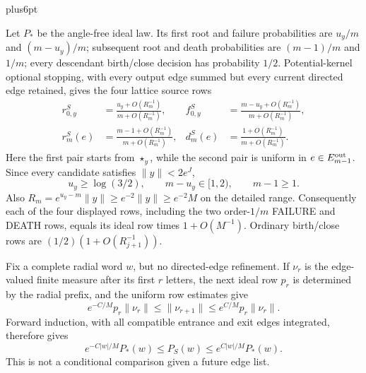 \documentclass[12pt,reqno]{amsart}
\makeatletter
\theoremstyle{plain}
\theoremstyle{definition}
\theoremstyle{remark}
\renewenvironment{proof}[1][\proofname]{%
  \par
  \pushQED{\qed}%
  \normalfont
  \topsep6pt plus6pt\relax
  \trivlist
  \item[\hskip\labelsep\slshape #1\@addpunct{.}]%
  \ignorespaces
}{%
  \popQED
  \endtrivlist
  \@endpefalse
}
\DeclareRobustCommand{\qed}{%
  \leavevmode\unskip\penalty9999\hbox{}\nobreak
  \ifmmode
    \makebox[0pt][l]{\qquad\hbox{\qedsymbol}}%
  \else
    \qquad\hbox{\qedsymbol}%
  \fi
}
\renewcommand{\qedsymbol}{\rule[.47pt]{4pt}{6pt}}
\numberwithin{equation}{section}
\makeatother
\begin{document}
\begin{proof}[Proof of Lemma~\ref{lem:buffered-transfer}]
Let $P_*$ be the angle-free ideal law.  Its first root and failure
probabilities are $u_y/m$ and $(m-u_y)/m$; subsequent root and death
probabilities are $(m-1)/m$ and $1/m$; every descendant
birth/close decision has probability $1/2$.  Potential-kernel optional
stopping, with every output edge summed but every current directed edge
retained, gives the four lattice source rows
\begin{equation}
\begin{aligned}
 r_{0,y}^S
   &=\frac{u_y+O(R_m^{-1})}{m+O(R_m^{-1})},
 & f_{0,y}^S
   &=\frac{m-u_y+O(R_m^{-1})}{m+O(R_m^{-1})},\\
 r_m^S(e)
   &=\frac{m-1+O(R_m^{-1})}{m+O(R_m^{-1})},
 & d_m^S(e)
   &=\frac{1+O(R_m^{-1})}{m+O(R_m^{-1})}.
\end{aligned}\label{eq:ct-transfer-45f-src}
\end{equation}
Here the first pair starts from $\star_y$, while the second pair is
uniform in $e\in E_{m-1}^{\rm out}$.  Since every candidate satisfies
$\|y\|<2e^J$,
\[
u_y\ge\log(3/2),\qquad m-u_y\in[1,2),\qquad m-1\ge1.
\]
Also $R_m=e^{u_y-m}\|y\|\ge e^{-2}\|y\|\ge e^{-2}M$ on the detailed
range.  Consequently each of the four displayed rows, including the two
order-$1/m$ FAILURE and DEATH rows, equals its ideal row times
$1+O(M^{-1})$.  Ordinary birth/close rows are
$(1/2)(1+O(R_{j+1}^{-1}))$.

Fix a complete radial word $w$, but no directed-edge refinement.  If
$\nu_r$ is the edge-valued finite measure after its first $r$ letters,
the next ideal row $p_r$ is determined by the radial prefix, and the
uniform row estimates give
\[
e^{-C/M}p_r\|\nu_r\|\le\|\nu_{r+1}\|
       \le e^{C/M}p_r\|\nu_r\|.
\]
Forward induction, with all compatible entrance and exit edges integrated,
therefore gives
\begin{equation}
e^{-C|w|/M}P_*(w)\le P_S(w)
       \le e^{C|w|/M}P_*(w).\label{eq:ct-transfer-45f}
\end{equation}
This is not a conditional comparison given a future edge list.


\end{proof}
\end{document}
